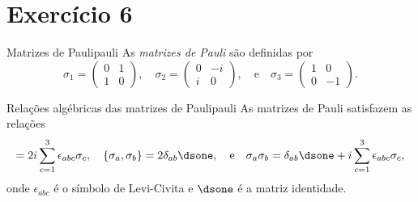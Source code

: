 \section*{Exercício 6}
\begin{definition}{Matrizes de Pauli}{pauli}
    As \emph{matrizes de Pauli} são definidas por
    \begin{equation*}
        \sigma_1 = \begin{pmatrix}
            0&1\\1&0
        \end{pmatrix},\quad\sigma_2 = \begin{pmatrix}
            0&-i\\i&0
        \end{pmatrix},\quad\text{e}\quad\sigma_3 = \begin{pmatrix}
            1&0\\0&-1
        \end{pmatrix}.
    \end{equation*}
\end{definition}
\begin{proposition}{Relações algébricas das matrizes de Pauli}{pauli}
    As matrizes de Pauli satisfazem as relações
    \begin{equation*}
        [\sigma_a,\sigma_b] = 2i \sum_{c = 1}^3 \epsilon_{abc}\sigma_c,\quad
        \{\sigma_a, \sigma_b\} = 2\delta_{ab} \dsone,\quad\text{e}\quad
        \sigma_a \sigma_b = \delta_{ab} \dsone + i \sum_{c = 1}^3 \epsilon_{abc}\sigma_c,
    \end{equation*}
    onde \(\epsilon_{abc}\) é o símbolo de Levi-Civita e \(\dsone\) é a matriz identidade.
\end{proposition}

